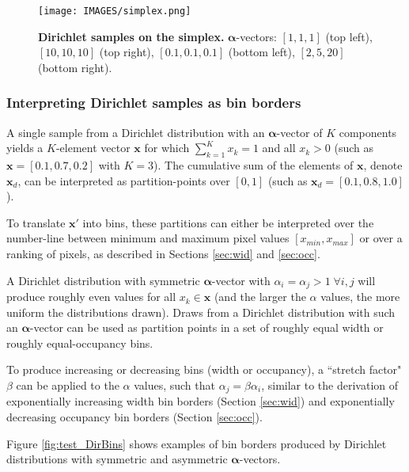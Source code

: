 \begin{figure}
\centering
\texttt{[image: IMAGES/simplex.png]}
\caption[Dirichlet samples on the simplex]{\textbf{Dirichlet samples on the simplex.} $\boldsymbol{\alpha}$-vectors: $[1,1,1]$ (top left), $[10,10,10]$ (top right), $[0.1,0.1,0.1]$ (bottom left), $[2,5,20]$ (bottom right).}
\label{fig:simplex}
\end{figure}

\subsubsection{Interpreting Dirichlet samples as bin borders}

A single sample from a Dirichlet distribution with an $\boldsymbol{\alpha}$-vector of $K$ components yields a $K$-element vector $\mathbf{x}$ for which $\sum_{k=1}^K x_k = 1$ and all $x_k > 0$ (such as $\mathbf{x}=[0.1,0.7,0.2]$ with $K=3$). The cumulative sum of the elements of $\mathbf{x}$, denote $\mathbf{x}_d$, can be interpreted as partition-points over $[0,1]$ (such as $\mathbf{x}_d = [0.1,0.8,1.0]$). 

To translate $\mathbf{x}'$ into bins, these partitions can either be interpreted over the number-line between minimum and maximum pixel values $[x_{min}, x_{max}]$ or over a ranking of pixels, as described in Sections \ref{sec:wid} and \ref{sec:occ}.

A Dirichlet distribution with symmetric $\boldsymbol{\alpha}$-vector with $\alpha_i = \alpha_j > 1 \; \forall i,j$ will produce roughly even values for all $x_k \in \mathbf{x}$ (and the larger the $\alpha$ values, the more uniform the distributions drawn). Draws from a Dirichlet distribution with such an $\boldsymbol{\alpha}$-vector can be used as partition points in a set of roughly equal width or roughly equal-occupancy bins.

To produce increasing or decreasing bins (width or occupancy), a ``stretch factor" $\beta$ can be applied to the $\alpha$ values, such that $\alpha_j = \beta\alpha_i$, similar to the derivation of exponentially increasing width bin borders (Section \ref{sec:wid}) and exponentially decreasing occupancy bin borders (Section \ref{sec:occ}).

Figure \ref{fig:test_DirBins} shows examples of bin borders produced by Dirichlet distributions with symmetric and asymmetric $\boldsymbol{\alpha}$-vectors.

